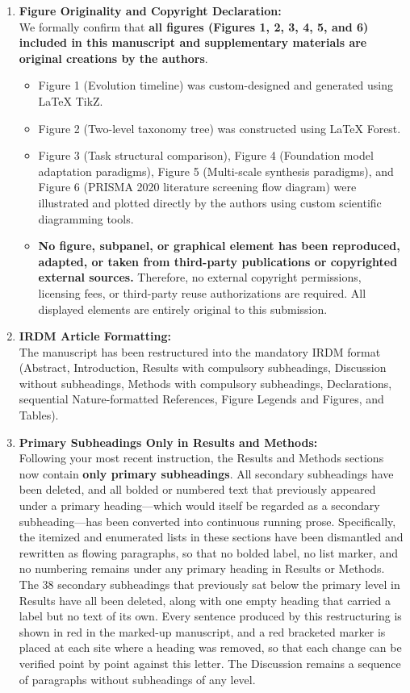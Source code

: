 \documentclass[11pt,a4paper]{article}
\begin{document}
\begin{enumerate}
    \item \textbf{Figure Originality and Copyright Declaration:}\\
    We formally confirm that \textbf{all figures (Figures 1, 2, 3, 4, 5, and 6) included in this manuscript and supplementary materials are original creations by the authors}.
    \begin{itemize}
        \item Figure 1 (Evolution timeline) was custom-designed and generated using LaTeX TikZ.
        \item Figure 2 (Two-level taxonomy tree) was constructed using LaTeX Forest.
        \item Figure 3 (Task structural comparison), Figure 4 (Foundation model adaptation paradigms), Figure 5 (Multi-scale synthesis paradigms), and Figure 6 (PRISMA 2020 literature screening flow diagram) were illustrated and plotted directly by the authors using custom scientific diagramming tools.
        \item \textbf{No figure, subpanel, or graphical element has been reproduced, adapted, or taken from third-party publications or copyrighted external sources.} Therefore, no external copyright permissions, licensing fees, or third-party reuse authorizations are required. All displayed elements are entirely original to this submission.
    \end{itemize}

    \item \textbf{IRDM Article Formatting:}\\
    The manuscript has been restructured into the mandatory IRDM format (Abstract, Introduction, Results with compulsory subheadings, Discussion without subheadings, Methods with compulsory subheadings, Declarations, sequential Nature-formatted References, Figure Legends and Figures, and Tables).

    \item \textbf{Primary Subheadings Only in Results and Methods:}\\
    Following your most recent instruction, the Results and Methods sections now contain \textbf{only primary subheadings}. All secondary subheadings have been deleted, and all bolded or numbered text that previously appeared under a primary heading---which would itself be regarded as a secondary subheading---has been converted into continuous running prose. Specifically, the itemized and enumerated lists in these sections have been dismantled and rewritten as flowing paragraphs, so that no bolded label, no list marker, and no numbering remains under any primary heading in Results or Methods. The 38 secondary subheadings that previously sat below the primary level in Results have all been deleted, along with one empty heading that carried a label but no text of its own. Every sentence produced by this restructuring is shown in red in the marked-up manuscript, and a red bracketed marker is placed at each site where a heading was removed, so that each change can be verified point by point against this letter. The Discussion remains a sequence of paragraphs without subheadings of any level.


\end{enumerate}
\end{document}
